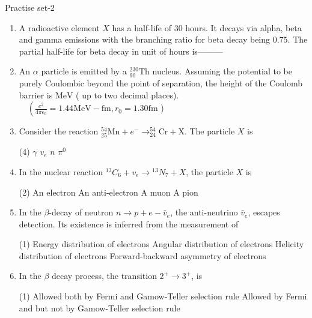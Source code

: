 \newpage
\begin{abox}
	Practise set-2
\end{abox}
\begin{enumerate}
	\item A radioactive element $X$ has a half-life of 30 hours. It decays via alpha, beta and gamma emissions with the branching ratio for beta decay being $0.75$. The partial half-life for beta decay in unit of hours is---------
	{}
	\item An $\alpha$ particle is emitted by a ${ }_{90}^{230} \mathrm{Th}$ nucleus. Assuming the potential to be purely Coulombic beyond the point of separation, the height of the Coulomb barrier is
	$\mathrm{MeV}$ ( up to two decimal places). $\quad\left(\frac{e^2}{4 \pi \epsilon_0}=1.44 \mathrm{MeV}-\mathrm{fm}, r_0=1.30 \mathrm{fm}\right.$ )
	{}
	\item Consider the reaction ${ }_{25}^{54} \mathrm{Mn}+e^{-} \rightarrow_{24}^{54} \mathrm{Cr}+\mathrm{X}$. The particle $X$ is
	{}
	 \begin{tasks}(4)
		\task[\textbf{a.}]$\gamma$
		\task[\textbf{b.}]$v_e$
		\task[\textbf{c.}]$n$
		\task[\textbf{d.}]$\pi^0$ 
	\end{tasks}
	\item In the nuclear reaction ${ }^{13} C_6+v_e \rightarrow{ }^{13} N_7+X$, the particle $X$ is
	{}
	 \begin{tasks}(2)
		\task[\textbf{a.}]An electron
		\task[\textbf{b.}]An anti-electron
		\task[\textbf{c.}]A muon
		\task[\textbf{d.}]A pion 
	\end{tasks}
	\item In the $\beta$-decay of neutron $n \rightarrow p+e-\bar{v}_e$, the anti-neutrino $\bar{v}_e$, escapes detection. Its existence is inferred from the measurement of
	{}
	 \begin{tasks}(1)
		\task[\textbf{a.}]Energy distribution of electrons
		\task[\textbf{b.}]Angular distribution of electrons
		\task[\textbf{c.}]Helicity distribution of electrons
		\task[\textbf{d.}]Forward-backward asymmetry of electrons 
	\end{tasks}
	\item In the $\beta$ decay process, the transition $2^{+} \rightarrow 3^{+}$, is
	{}
	 \begin{tasks}(1)
		\task[\textbf{a.}]Allowed both by Fermi and Gamow-Teller selection rule
		\task[\textbf{b.}] Allowed by Fermi and but not by Gamow-Teller selection rule

\end{tasks}
\end{enumerate}
